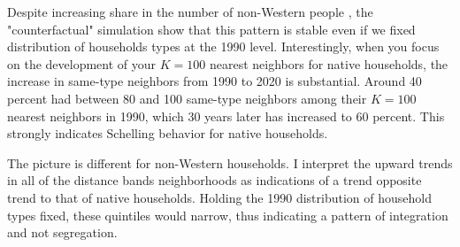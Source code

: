 \documentclass[main.tex]{subfiles}
\begin{document}
Despite increasing share in the number of non-Western people , the "counterfactual" simulation show that this pattern is stable even if we fixed distribution of households types at the 1990 level. Interestingly, when you focus on the development of your $K=100$ nearest neighbors for native households, the increase in same-type neighbors from 1990 to 2020 is substantial. Around 40 percent had between 80 and 100 same-type neighbors among their $K=100$ nearest neighbors in 1990, which 30 years later has increased to 60 percent. This strongly indicates Schelling behavior for native households.

The picture is different for non-Western households. I interpret the upward trends in all of the distance bands neighborhoods as indications of a trend opposite trend to that of native households. Holding the 1990 distribution of household types fixed, these quintiles would narrow, thus indicating a pattern of integration and not segregation.
\end{document}
